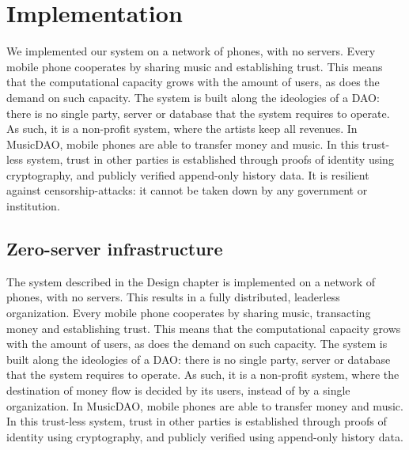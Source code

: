 \chapter{Implementation}
We implemented our system on a network of phones, with no servers. Every mobile phone cooperates by sharing music and establishing trust. This means that the computational capacity grows with the amount of users, as does the demand on such capacity. The system is built along the ideologies of a DAO: there is no single party, server or database that the system requires to operate. As such, it is a non-profit system, where the artists keep all revenues. In MusicDAO, mobile phones are able to transfer money and music. In this trust-less system, trust in other parties is established through proofs of identity using cryptography, and publicly verified append-only history data. It is resilient against censorship-attacks: it cannot be taken down by any government or institution.

\section{Zero-server infrastructure}
The system described in the Design chapter is implemented on a network of phones, with no servers. This results in a fully distributed, leaderless organization. Every mobile phone cooperates by sharing music, transacting money and establishing trust. This means that the computational capacity grows with the amount of users, as does the demand on such capacity. The system is built along the ideologies of a DAO: there is no single party, server or database that the system requires to operate. As such, it is a non-profit system, where the destination of money flow is decided by its users, instead of by a single organization. In MusicDAO, mobile phones are able to transfer money and music. In this trust-less system, trust in other parties is established through proofs of identity using cryptography, and publicly verified using append-only history data.

